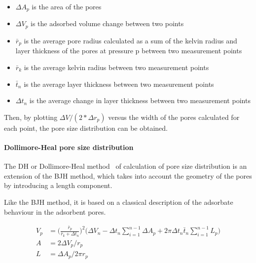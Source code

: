 \begin{itemize}
    
    \item \(\Delta A_p\) is the area of the pores
    \item \(\Delta V_p\) is the adsorbed volume change between two points
    \item \(\bar{r}_p\) is the average pore radius calculated as a sum of the
    kelvin radius and layer thickness of the pores at pressure p between two
    measurement points
    \item \(\bar{r}_k\) is the average kelvin radius between two measurement points
    \item \(\bar{t}_n\) is the average layer thickness between two measurement points
    \item \(\Delta t_n\) is the average change in layer thickness between two measurement points
    
\end{itemize}

Then, by plotting \(\Delta V / (2*\Delta r_p)\) versus the width of the pores calculated
for each point, the pore size distribution can be obtained.

\paragraph{Dollimore-Heal pore size distribution}

The DH or Dollimore-Heal method~\cite{dollimorePoresizeDistributionTypical1970} 
of calculation of pore size distribution is an
extension of the BJH method, which takes into account the geometry of the pores
by introducing a length component.

Like the BJH method, it is based on a classical description of the adsorbate behaviour
in the adsorbent pores. 

\begin{align}
    V_p & = \Big(\frac{\bar{r}_p}{\bar{r}_k + \Delta t_n}\Big)^2
    \Big(\Delta V_n - \Delta t_n \sum_{i=1}^{n-1} \Delta A_p
    + 2 \pi \Delta t_n \bar{t}_n \sum_{i=1}^{n-1} L_p\Big) \\
%
    A & = 2 \Delta V_p / r_p \\
%
    L & = \Delta A_p / 2 \pi r_p
\end{align}

